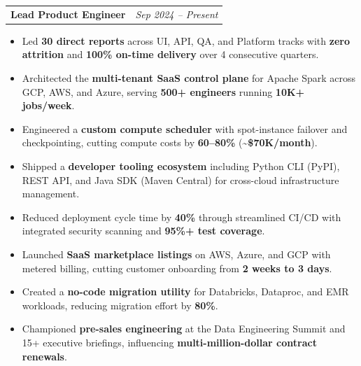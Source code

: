 \documentclass[10pt, letterpaper]{article}
\makeatletter
\newcommand{\job}[4]{%
  \vspace{4pt}%
  \noindent\begin{tabular*}{\textwidth}{@{}l@{\extracolsep{\fill}}r@{}}%
    \textbf{#1}\enspace{\color{mid}\small$|$\enspace#2,\ #3} &
    {\color{mid}\small\textit{#4}}%
  \end{tabular*}%
  \vspace{0pt}%
}
\makeatother
\begin{document}
\job{Lead Product Engineer}{Modak Analytics}{Hyderabad}{Sep 2024 -- Present}
\begin{itemize}
  \item Led \textbf{30 direct reports} across UI, API, QA, and Platform tracks with
    \textbf{zero attrition} and \textbf{100\% on-time delivery} over 4 consecutive quarters.

  \item Architected the \textbf{multi-tenant SaaS control plane} for Apache Spark across GCP,
    AWS, and Azure, serving \textbf{500+ engineers} running \textbf{10K+ jobs/week}.

  \item Engineered a \textbf{custom compute scheduler} with spot-instance failover and
    checkpointing, cutting compute costs by \textbf{60--80\%} (\textasciitilde\textbf{\$70K/month}).

  \item Shipped a \textbf{developer tooling ecosystem} including Python CLI (PyPI), REST API,
    and Java SDK (Maven Central) for cross-cloud infrastructure management.

  \item Reduced deployment cycle time by \textbf{40\%} through streamlined CI/CD with
    integrated security scanning and \textbf{95\%+ test coverage}.

  \item Launched \textbf{SaaS marketplace listings} on AWS, Azure, and GCP with metered billing,
    cutting customer onboarding from \textbf{2 weeks to 3 days}.

  \item Created a \textbf{no-code migration utility} for Databricks, Dataproc, and EMR
    workloads, reducing migration effort by \textbf{80\%}.

  \item Championed \textbf{pre-sales engineering} at the Data Engineering Summit and 15+
    executive briefings, influencing \textbf{multi-million-dollar contract renewals}.
\end{itemize}
\end{document}
